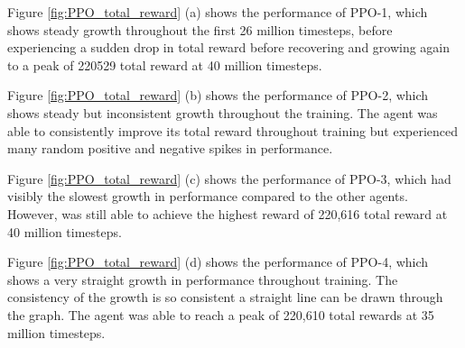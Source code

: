 Figure \ref{fig:PPO_total_reward} (a) shows the performance of PPO-1, which shows steady growth throughout the first 26 million timesteps, before experiencing a sudden drop in total reward before recovering and growing again to a peak of 220529 total reward at 40 million timesteps.

Figure \ref{fig:PPO_total_reward} (b) shows the performance of PPO-2, which shows steady but inconsistent growth throughout the training. The agent was able to consistently improve its total reward throughout training but experienced many random positive and negative spikes in performance.

Figure \ref{fig:PPO_total_reward} (c) shows the performance of PPO-3, which had visibly the slowest growth in performance compared to the other agents. However, was still able to achieve the highest reward of 220,616 total reward at 40 million timesteps.

Figure \ref{fig:PPO_total_reward} (d) shows the performance of PPO-4, which shows a very straight growth in performance throughout training. The consistency of the growth is so consistent a straight line can be drawn through the graph. The agent was able to reach a peak of 220,610 total rewards at 35 million timesteps.

